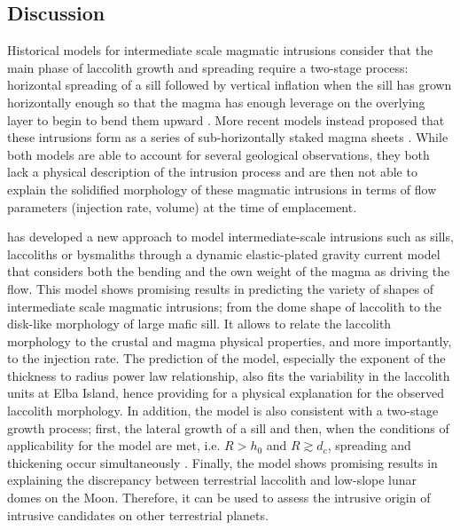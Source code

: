 \subsection{Discussion}
\label{C2-sec:discussion-1}

Historical models for intermediate  scale magmatic intrusions consider
that  the main  phase  of  laccolith growth  and  spreading require  a
two-stage process: horizontal spreading of a sill followed by vertical
inflation  when the  sill has  grown horizontally  enough so  that the
magma has enough leverage on the overlying layer to begin to bend them
upward \citep{Johnson:1973ho,Koch:1981if}.  More recent models instead
proposed that  these intrusions form  as a series  of sub-horizontally
staked magma  sheets \citep{Morgan:2008hj,Menand:2011ki}.   While both
models are able  to account for several  geological observations, they
both lack a physical description of the intrusion process and are then
not  able  to explain  the  solidified  morphology of  these  magmatic
intrusions in terms of flow parameters (injection rate, volume) at the
time of emplacement.

\citet{Michaut:2011kg}  has   developed  a   new  approach   to  model
intermediate-scale intrusions such as  sills, laccoliths or bysmaliths
through a dynamic elastic-plated  gravity current model that considers
both the bending and the own weight  of the magma as driving the flow.
This model shows promising results in predicting the variety of shapes
of  intermediate scale  magmatic intrusions;  from the  dome shape  of
laccolith to the disk-like morphology  of large mafic sill.  It allows
to relate the  laccolith morphology to the crustal  and magma physical
properties,  and  more  importantly,   to  the  injection  rate.   The
prediction of the  model, especially the exponent of  the thickness to
radius  power  law relationship,  also  fits  the variability  in  the
laccolith  units  at  Elba  Island, hence  providing  for  a  physical
explanation for  the observed laccolith morphology.   In addition, the
model is also  consistent with a two-stage growth  process; first, the
lateral  growth   of  a  sill   and  then,  when  the   conditions  of
applicability for the model are met, i.e.  $R>h_0$ and $R \gtrsim d_c$,
spreading       and        thickening       occur       simultaneously
\citep{Michaut:2011kg}. Finally, the model  shows promising results in
explaining the discrepancy between terrestrial laccolith and low-slope
lunar domes  on the  Moon.  Therefore,  it can be  used to  assess the
intrusive origin of intrusive candidates on other terrestrial planets.

